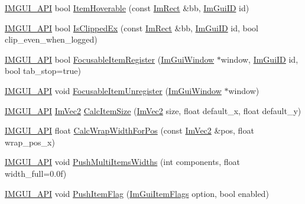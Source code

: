 \begin{DoxyCompactItemize}
\item 
\mbox{\hyperlink{imgui_8h_a43829975e84e45d1149597467a14bbf5}{I\+M\+G\+U\+I\+\_\+\+A\+PI}} bool \mbox{\hyperlink{namespace_im_gui_a488b86a9f235923304186fb86ff64ffb}{Item\+Hoverable}} (const \mbox{\hyperlink{struct_im_rect}{Im\+Rect}} \&bb, \mbox{\hyperlink{imgui_8h_a1785c9b6f4e16406764a85f32582236f}{Im\+Gui\+ID}} id)
\item 
\mbox{\hyperlink{imgui_8h_a43829975e84e45d1149597467a14bbf5}{I\+M\+G\+U\+I\+\_\+\+A\+PI}} bool \mbox{\hyperlink{namespace_im_gui_a8674467ae34d04bc99df1f7f98f47407}{Is\+Clipped\+Ex}} (const \mbox{\hyperlink{struct_im_rect}{Im\+Rect}} \&bb, \mbox{\hyperlink{imgui_8h_a1785c9b6f4e16406764a85f32582236f}{Im\+Gui\+ID}} id, bool clip\+\_\+even\+\_\+when\+\_\+logged)
\item 
\mbox{\hyperlink{imgui_8h_a43829975e84e45d1149597467a14bbf5}{I\+M\+G\+U\+I\+\_\+\+A\+PI}} bool \mbox{\hyperlink{namespace_im_gui_ab1e2f7069edbab669b56e93e30930c45}{Focusable\+Item\+Register}} (\mbox{\hyperlink{struct_im_gui_window}{Im\+Gui\+Window}} $\ast$window, \mbox{\hyperlink{imgui_8h_a1785c9b6f4e16406764a85f32582236f}{Im\+Gui\+ID}} id, bool tab\+\_\+stop=true)
\item 
\mbox{\hyperlink{imgui_8h_a43829975e84e45d1149597467a14bbf5}{I\+M\+G\+U\+I\+\_\+\+A\+PI}} void \mbox{\hyperlink{namespace_im_gui_a390518fcaef04b4d399d2475d4d84df7}{Focusable\+Item\+Unregister}} (\mbox{\hyperlink{struct_im_gui_window}{Im\+Gui\+Window}} $\ast$window)
\item 
\mbox{\hyperlink{imgui_8h_a43829975e84e45d1149597467a14bbf5}{I\+M\+G\+U\+I\+\_\+\+A\+PI}} \mbox{\hyperlink{struct_im_vec2}{Im\+Vec2}} \mbox{\hyperlink{namespace_im_gui_a3c1505e785f9571ed82500692a727c5f}{Calc\+Item\+Size}} (\mbox{\hyperlink{struct_im_vec2}{Im\+Vec2}} size, float default\+\_\+x, float default\+\_\+y)
\item 
\mbox{\hyperlink{imgui_8h_a43829975e84e45d1149597467a14bbf5}{I\+M\+G\+U\+I\+\_\+\+A\+PI}} float \mbox{\hyperlink{namespace_im_gui_a66416151e58c34cd02973976de66e0e9}{Calc\+Wrap\+Width\+For\+Pos}} (const \mbox{\hyperlink{struct_im_vec2}{Im\+Vec2}} \&pos, float wrap\+\_\+pos\+\_\+x)
\item 
\mbox{\hyperlink{imgui_8h_a43829975e84e45d1149597467a14bbf5}{I\+M\+G\+U\+I\+\_\+\+A\+PI}} void \mbox{\hyperlink{namespace_im_gui_ab913605fcf6d405d102cdf56cd414a5a}{Push\+Multi\+Items\+Widths}} (int components, float width\+\_\+full=0.\+0f)
\item 
\mbox{\hyperlink{imgui_8h_a43829975e84e45d1149597467a14bbf5}{I\+M\+G\+U\+I\+\_\+\+A\+PI}} void \mbox{\hyperlink{namespace_im_gui_ac7301f6378333f6d17f47823eed9e00a}{Push\+Item\+Flag}} (\mbox{\hyperlink{imgui__internal_8h_abcf9eafab4557e911b2c0d8fe2feeb38}{Im\+Gui\+Item\+Flags}} option, bool enabled)

\end{DoxyCompactItemize}
